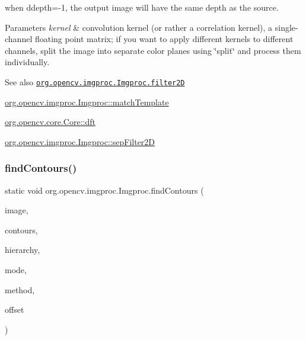 when {\ttfamily ddepth=-\/1}, the output image will have the same depth as the source.


\begin{DoxyParams}{Parameters}
{\em kernel} & convolution kernel (or rather a correlation kernel), a single-\/channel floating point matrix; if you want to apply different kernels to different channels, split the image into separate color planes using \char`\"{}split\char`\"{} and process them individually.\\
\hline
\end{DoxyParams}
\begin{DoxySeeAlso}{See also}
\href{http://docs.opencv.org/modules/imgproc/doc/filtering.html#filter2d}{\tt org.\+opencv.\+imgproc.\+Imgproc.\+filter2D} 

\mbox{\hyperlink{classorg_1_1opencv_1_1imgproc_1_1_imgproc_ab7f64647bb4d0400664056af42b90063}{org.\+opencv.\+imgproc.\+Imgproc\+::match\+Template}} 

\mbox{\hyperlink{classorg_1_1opencv_1_1core_1_1_core_a43313221157a3008972a04727a65a58d}{org.\+opencv.\+core.\+Core\+::dft}} 

\mbox{\hyperlink{classorg_1_1opencv_1_1imgproc_1_1_imgproc_a7c78cbc2fc093f0008a749cfa15c3a81}{org.\+opencv.\+imgproc.\+Imgproc\+::sep\+Filter2D}} 
\end{DoxySeeAlso}
\mbox{\label{classorg_1_1opencv_1_1imgproc_1_1_imgproc_a60284da5baddfe0b44c6553177de8bf9}} 
\subsubsection{\texorpdfstring{find\+Contours()}{findContours()}\hspace{0.1cm}{\footnotesize\ttfamily [1/2]}}
{\footnotesize\ttfamily static void org.\+opencv.\+imgproc.\+Imgproc.\+find\+Contours (\begin{DoxyParamCaption}\item[{\mbox{\hyperlink{classorg_1_1opencv_1_1core_1_1_mat}{Mat}}}]{image,  }\item[{List$<$ \mbox{\hyperlink{classorg_1_1opencv_1_1core_1_1_mat_of_point}{Mat\+Of\+Point}} $>$}]{contours,  }\item[{\mbox{\hyperlink{classorg_1_1opencv_1_1core_1_1_mat}{Mat}}}]{hierarchy,  }\item[{int}]{mode,  }\item[{int}]{method,  }\item[{\mbox{\hyperlink{classorg_1_1opencv_1_1core_1_1_point}{Point}}}]{offset }\end{DoxyParamCaption})\hspace{0.3cm}{\ttfamily [static]}}

